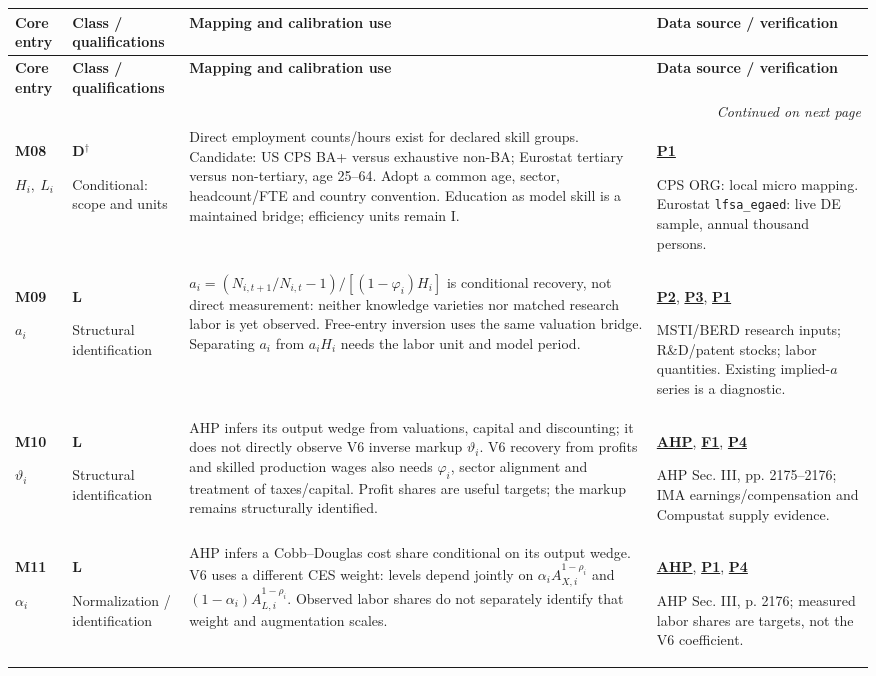 \documentclass[10pt,a4paper,landscape]{article}
\makeatletter
\newcommand{\code}[1]{{\footnotesize\texttt{#1}}}
\newenvironment{measuretable}{%
\fontsize{9.4}{10.8}\selectfont\setlength{\parskip}{1pt}
\begin{longtable}{@{}P{\dimexpr .14\textwidth-4.2pt\relax}P{\dimexpr .135\textwidth-4.05pt\relax}P{\dimexpr .455\textwidth-13.65pt\relax}P{\dimexpr .27\textwidth-8.1pt\relax}@{}}
\toprule\rowcolor{tablehead}\textbf{Core entry} & \textbf{Class / qualifications} & \textbf{Mapping and calibration use} & \textbf{Data source / verification}\\\midrule
\endfirsthead
\toprule\rowcolor{tablehead}\textbf{Core entry} & \textbf{Class / qualifications} & \textbf{Mapping and calibration use} & \textbf{Data source / verification}\\\midrule
\endhead\midrule\multicolumn{4}{r}{\footnotesize\itshape Continued on next page}\\\endfoot
\bottomrule\endlastfoot
}{\end{longtable}}
\makeatother
\begin{document}
\begin{measuretable}
\textbf{M08}\par $H_i,\ L_i$ & \textbf{D}$^\dagger$\par Conditional: scope and units & Direct employment counts/hours exist for declared skill groups. Candidate: US CPS BA+ versus exhaustive non-BA; Eurostat tertiary versus non-tertiary, age 25--64. Adopt a common age, sector, headcount/FTE and country convention. Education as model skill is a maintained bridge; efficiency units remain I. & \hyperlink{src-P1}{\textbf{P1}}\par CPS ORG: local micro mapping. Eurostat \code{lfsa\_egaed}: live DE sample, annual thousand persons.\\[4pt]
\textbf{M09}\par $a_i$ & \textbf{L}\par Structural identification & $a_i=(N_{i,t+1}/N_{i,t}-1)/[(1-\varphi_i)H_i]$ is conditional recovery, not direct measurement: neither knowledge varieties nor matched research labor is yet observed. Free-entry inversion uses the same valuation bridge. Separating $a_i$ from $a_iH_i$ needs the labor unit and model period. & \hyperlink{src-P2}{\textbf{P2}}, \hyperlink{src-P3}{\textbf{P3}}, \hyperlink{src-P1}{\textbf{P1}}\par MSTI/BERD research inputs; R\&D/patent stocks; labor quantities. Existing implied-$a$ series is a diagnostic.\\[4pt]
\textbf{M10}\par $\vartheta_i$ & \textbf{L}\par Structural identification & AHP infers its output wedge from valuations, capital and discounting; it does not directly observe V6 inverse markup $\vartheta_i$. V6 recovery from profits and skilled production wages also needs $\varphi_i$, sector alignment and treatment of taxes/capital. Profit shares are useful targets; the markup remains structurally identified. & \hyperlink{src-AHP}{\textbf{AHP}}, \hyperlink{src-F1}{\textbf{F1}}, \hyperlink{src-P4}{\textbf{P4}}\par AHP Sec. III, pp. 2175--2176; IMA earnings/compensation and Compustat supply evidence.\\[4pt]
\textbf{M11}\par $\alpha_i$ & \textbf{L}\par Normalization / identification & AHP infers a Cobb--Douglas cost share conditional on its output wedge. V6 uses a different CES weight: levels depend jointly on $\alpha_i A_{X,i}^{1-\rho_i}$ and $(1-\alpha_i)A_{L,i}^{1-\rho_i}$. Observed labor shares do not separately identify that weight and augmentation scales. & \hyperlink{src-AHP}{\textbf{AHP}}, \hyperlink{src-P1}{\textbf{P1}}, \hyperlink{src-P4}{\textbf{P4}}\par AHP Sec. III, p. 2176; measured labor shares are targets, not the V6 coefficient.\\[4pt]

\end{measuretable}
\end{document}
